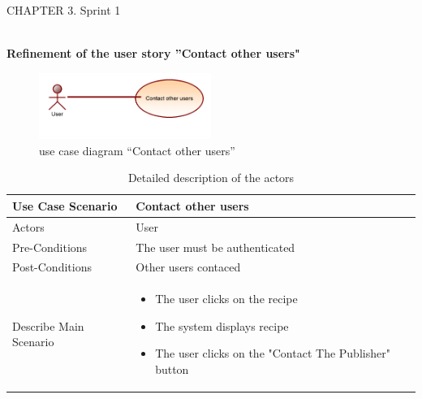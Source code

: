 \documentclass{article}
\begin{document}
{{{{{{\newpage
\noindent
CHAPTER 3.  Sprint 1 \\
\underline{\hspace{\textwidth}} \vspace{0.2cm}\\
{\large \textbf{Refinement of the user story ”Contact other users"}
\begin{figure}[htbp]
    \centering
    \includegraphics[width=0.5\textwidth]{conta}
    \caption{use case diagram “Contact other users”}
    \label{fig:design2}
\end{figure}
\begin{table}[h]
    \centering
    \begin{tabularx}{\textwidth}{X|X}
        \toprule
        Use Case Scenario & Contact other users \\
        \midrule
        Actors & User \\
        \midrule
        Pre-Conditions & The user must be authenticated \\
        \midrule
	 Post-Conditions & Other users contaced  \\
        \midrule
        Describe Main Scenario &  \begin{itemize}[label=$\bullet$]
            \item The user clicks on the recipe
            \item The system displays recipe
            \item The user clicks on the "Contact The Publisher" button
        \end{itemize} \\
        \bottomrule
    \end{tabularx}
    \caption{Detailed description of the actors}
    \label{tab:actors_roles}
\end{table}















}}}}}}}
\end{document}
